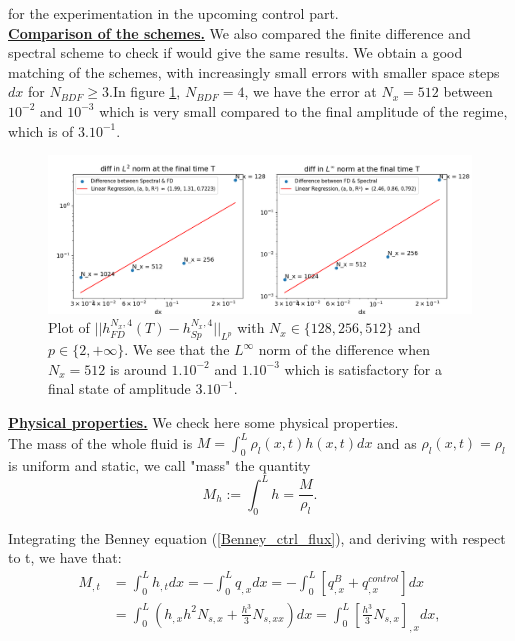 \documentclass[12pt]{article}
\begin{document}
for the experimentation in the upcoming control part.
\\


\underline{\textbf{Comparison of the schemes.}} We also compared the finite difference and spectral scheme to check if would give the same results.
 We obtain a good matching of the schemes, with increasingly small errors with smaller space steps $dx$ for $N_{BDF} \geq 3.$In figure \ref{fig:plot_comparison_FD_Sp_methods},
 $N_{BDF}=4$,
  we have the error at $N_x = 512$ between $10^{-2}$ and ${10^{-3}}$ which is very small compared to the final amplitude of the regime, which is of $3.10^{-1}$.

\begin{figure}
    \centering
    \includegraphics[width=1\linewidth]{Verif_scheme/Comparison_scheme_BDF4.png}
    \caption{Plot of $||h_{FD}^{N_x, 4}(T)-h_{Sp}^{N_x,4}||_{L^p}$ with $N_x \in \{128, 256, 512\}$ and $p \in \{2, +\infty\}.$
     We see that the $L^{\infty}$ norm of the difference when $N_x=512$ is around $1.10^{-2}$ and $1.10^{-3}$ which is satisfactory for a final state of amplitude $3.10^{-1}$. }
    \label{fig:plot_comparison_FD_Sp_methods}
\end{figure}
\vspace{0.5cm}

\underline{\textbf{Physical properties.}}
We check here some physical properties.
\\

The mass of the whole fluid is $M=\int_0^L\rho_l(x,t)h(x,t)dx$ and as $\rho_l(x,t)=\rho_l$ is uniform and static, we call "mass" the quantity 
\begin{equation}
M_h := \int_0^Lh = \frac{M}{\rho_l}.
\end{equation}

Integrating the Benney equation (\ref{Benney_ctrl_flux}), and deriving with respect to t, we have that: 
\begin{align*}
    M_{,t}&=\int_0^Lh_{,t}dx=-\int_0^L q_{,x}dx = -\int_0^L[q^B_{,x}+q^{control}_{,x}]dx \\ &= \int_0^L(h_{,x}h^2N_{s,x}+\frac{h^3}{3}N_{s,xx})dx=\int_0^L[\frac{h^3}{3}N_{s,x}]_{,x}dx ,
\end{align*}
\end{document}
